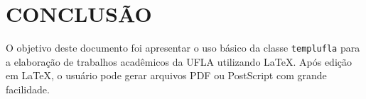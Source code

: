 \chapter{\MakeUppercase{Conclusão}}\label{sec:conclusao}

O objetivo deste documento foi apresentar o uso básico da classe \texttt{templufla} para a elaboração de trabalhos acadêmicos da UFLA utilizando \LaTeX. Após edição em \LaTeX, o usuário pode gerar arquivos PDF \cite{PDF2004} ou PostScript \cite{PostScript1999} com grande facilidade.

\vfill
\begin{center}
\noindent{}%
\end{center}%
